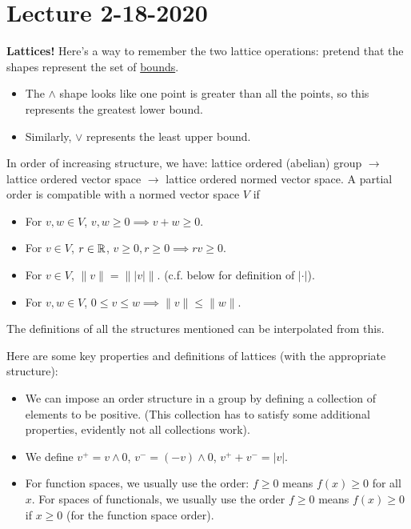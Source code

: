 \section{Lecture 2-18-2020}
\textbf{Lattices!} Here's a way to remember the two lattice operations: pretend that the shapes represent the set of \underline{bounds}.
\begin{itemize}
    \item
    The $\wedge$ shape looks like one point is greater than all the points, so this represents the greatest lower bound.

    \item
    Similarly, $\vee$ represents the least upper bound.

\end{itemize}
In order of increasing structure, we have: lattice ordered (abelian) group $ \rightarrow $ lattice ordered vector space $ \rightarrow $ lattice ordered normed vector space. A partial order is compatible with a normed vector space $V$ if
\begin{itemize}
    \item
    For $v,w \in V$, $v, w \geq 0 \implies v + w \geq 0$.
    
    \item
    For $v \in V$, $r \in {\mathbb R}$, $v \geq 0, r \geq 0 \implies rv \geq 0$.

    \item
    For $v \in V$, $\|v\| = \| |v| \|$. (c.f. below for definition of $|\cdot|$).

    \item
    For $v,w \in V$, $0 \leq v \leq w \implies \|v\| \leq \|w\|$.
\end{itemize}
The definitions of all the structures mentioned can be interpolated from this.

Here are some key properties and definitions of lattices (with the appropriate structure):
\begin{itemize}
    \item
    We can impose an order structure in a group by defining a collection of elements to be positive. (This collection has to satisfy some additional properties, evidently not all collections work).

    \item
    We define $v^+ = v \wedge 0$, $v^- = (-v) \wedge 0$, $v^+ + v^- = |v|$.

    \item
    For function spaces, we usually use the order: $f \geq 0$ means $f(x) \geq 0$ for all $x$. For spaces of functionals, we usually use the order $f \geq 0$ means $f(x) \geq 0$ if $x \geq 0$ (for the function space order).
\end{itemize}
